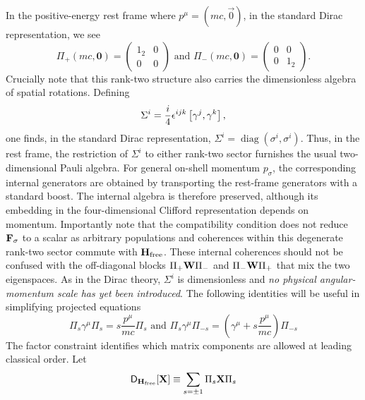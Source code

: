 \documentclass[final,5p,times,twocolumn]{elsarticle}
\begin{document}
In the positive-energy rest frame where $p^\mu=(mc,\Vec{0})$, in the standard Dirac representation, we see
$$
        \Pi_+(mc,\mathbf{0})
        =
        \begin{pmatrix}
        1_2 & 0\\
        0 & 0
        \end{pmatrix}
        \text{\ \  and \ \ }
        \Pi_-(mc,\mathbf{0})
        =
        \begin{pmatrix}
        0 & 0\\
        0 & 1_2
        \end{pmatrix}.
$$
Crucially note that this rank-two structure also carries the dimensionless algebra of spatial rotations. 
Defining
\begin{equation}
  \Sigma^i
  =
  \frac{i}{4}\epsilon^{ijk}
  \left[{\gamma^j} ,{\gamma^k}\right],
  \label{eq:dimensionless-spin}
\end{equation}
one finds, in the standard Dirac representation, $\Sigma^i=\operatorname{diag}(\sigma^i,\sigma^i)$. 
Thus, in the rest frame, the restriction of \(\Sigma^i\) to either rank-two sector furnishes the usual two-dimensional Pauli algebra. 
For general on-shell momentum \(p_\sigma\), the corresponding internal generators are obtained by transporting the rest-frame generators with a standard boost. 
The internal algebra is therefore preserved, although its embedding in the four-dimensional Clifford representation depends on momentum.
Importantly note that the compatibility condition does not reduce $\mathbf{F}_\sigma$ to a scalar as arbitrary populations and coherences within this degenerate rank-two sector commute with $\mathbf{H}_{\mathrm{free}}$. 
These internal coherences should not be confused with the off-diagonal blocks $\Pi_+\mathbf{W}\Pi_-$ and $\Pi_-\mathbf{W}\Pi_+$ that mix the two eigenspaces.
As in the Dirac theory, $\Sigma^i$ is dimensionless and \emph{no physical angular-momentum scale has yet been introduced}.
The following identities will be useful in simplifying projected equations
\begin{equation}
    \Pi_s \gamma^\mu \Pi_s = s \frac{p^\mu}{mc}\Pi_s \text{ and }\Pi_s \gamma^\mu \Pi_{-s}= \left(\gamma^\mu + s \frac{p^\mu}{mc} \right)\Pi_{-s}
\end{equation}
The factor constraint identifies which matrix components are allowed at leading classical order. Let
\begin{equation}
    \mathsf{D}_{\mathbf{H}_{\mathrm{free}}}[\mathbf{X}]
    \equiv
    \sum_{s=\pm1}\Pi_s\mathbf{X}\Pi_s
    \label{eq:block-projection}
\end{equation}
\end{document}
